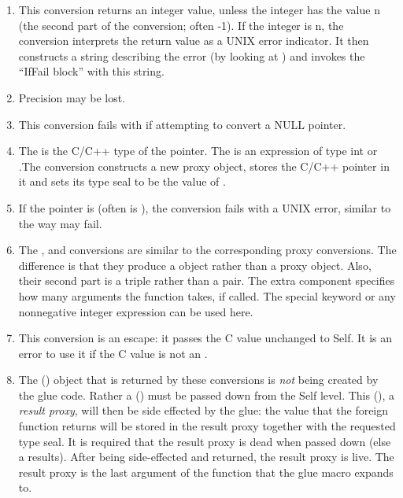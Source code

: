 \documentclass[letterpaper,10pt,english]{sphinxmanual}
\begin{document}
\begin{enumerate}
\item {} 
This conversion returns an integer value, unless the integer has the value n (the second part of
the conversion; often -1). If the integer is n, the conversion interprets the return value as a UNIX
error indicator. It then constructs a string describing the error (by looking at ) and invokes
the “IfFail block” with this string.

\item {} 
Precision may be lost.

\item {} 
This conversion fails with  if attempting to convert a NULL pointer.

\item {} 
The  is the C/C++ type of the pointer. The  is an expression of type int
or .The conversion constructs a new proxy object, stores the C/C++ pointer in it and sets
its type seal to be the value of .

\item {} 
If the pointer is  (often  is ), the conversion fails with a UNIX error, similar to the way
 may fail.

\item {} 
The ,  and  conversions are similar to
the corresponding proxy conversions. The difference is that they produce a  object rather
than a proxy object. Also, their second part is a triple rather than a pair. The extra component
specifies how many arguments the function takes, if called. The special keyword 
or any nonnegative integer expression can be used here.

\item {} 
This conversion is an escape: it passes the C value unchanged to Self. It is an error to use it if
the C value is not an .

\item {} 
The  () object that is returned by these conversions is \emph{not} being created by the
glue code. Rather a  () must be passed down from the Self level. This 
(), a \emph{result proxy}, will then be side effected by the glue: the value that the foreign function
returns will be stored in the result proxy together with the requested type seal. It is required
that the result proxy is dead when passed down (else a  results). After being
side-effected and returned, the result proxy is live. The result proxy is the last argument of the
function that the glue macro expands to.

\end{enumerate}
\end{document}
